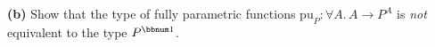 \textbf{(b)} Show that the type of fully parametric functions $\text{pu}_{P}:\forall A.\,A\rightarrow P^{A}$
is \emph{not} equivalent to the type $P^{\bbnum 1}$.

